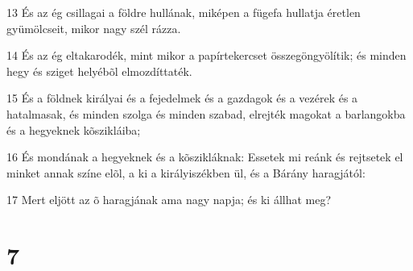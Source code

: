 \par 13 És az ég csillagai a földre hullának, miképen a fügefa hullatja éretlen gyümölcseit, mikor nagy szél rázza.
\par 14 És az ég eltakarodék, mint mikor a papírtekercset összegöngyölítik; és minden hegy és sziget helyébõl elmozdíttaték.
\par 15 És a földnek királyai és a fejedelmek és a gazdagok és a vezérek és a hatalmasak, és minden szolga és minden szabad, elrejték magokat a barlangokba és a hegyeknek kõszikláiba;
\par 16 És mondának a hegyeknek és a kõszikláknak: Essetek mi reánk és rejtsetek el minket annak színe elõl, a ki a királyiszékben ül, és a Bárány haragjától:
\par 17 Mert eljött az õ haragjának ama nagy napja; és ki állhat meg?

\chapter{7}

